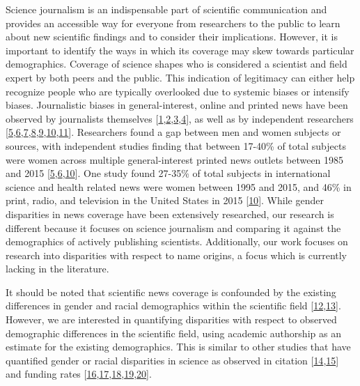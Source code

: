 Science journalism is an indispensable part of scientific communication and provides an accessible way for everyone from researchers to the public to learn about new scientific findings and to consider their implications.
However, it is important to identify the ways in which its coverage may skew towards particular demographics.
Coverage of science shapes who is considered a scientist and field expert by both peers and the public.
This indication of legitimacy can either help recognize people who are typically overlooked due to systemic biases or intensify biases.
Journalistic biases in general-interest, online and printed news have been observed by journalists themselves {[}\protect\hyperlink{ref-9uN0d5DN}{1},\protect\hyperlink{ref-CR5YHhw8}{2},\protect\hyperlink{ref-gud4dlat}{3},\protect\hyperlink{ref-soMuDIhH}{4}{]}, as well as by independent researchers {[}\protect\hyperlink{ref-zAQZlRnL}{5},\protect\hyperlink{ref-2svoFkJj}{6},\protect\hyperlink{ref-1onBkffH}{7},\protect\hyperlink{ref-WRatNaGC}{8},\protect\hyperlink{ref-DvlDdQFN}{9},\protect\hyperlink{ref-1718NkivT}{10},\protect\hyperlink{ref-17aOPYsbT}{11}{]}.
Researchers found a gap between men and women subjects or sources, with independent studies finding that between 17-40\% of total subjects were women across multiple general-interest printed news outlets between 1985 and 2015 {[}\protect\hyperlink{ref-zAQZlRnL}{5},\protect\hyperlink{ref-2svoFkJj}{6},\protect\hyperlink{ref-1718NkivT}{10}{]}.
One study found 27-35\% of total subjects in international science and health related news were women between 1995 and 2015, and 46\% in print, radio, and television in the United States in 2015 {[}\protect\hyperlink{ref-1718NkivT}{10}{]}.
While gender disparities in news coverage have been extensively researched, our research is different because it focuses on science journalism and comparing it against the demographics of actively publishing scientists.
Additionally, our work focuses on research into disparities with respect to name origins, a focus which is currently lacking in the literature.

It should be noted that scientific news coverage is confounded by the existing differences in gender and racial demographics within the scientific field {[}\protect\hyperlink{ref-1A5ym3UHq}{12},\protect\hyperlink{ref-mljKbJAo}{13}{]}.
However, we are interested in quantifying disparities with respect to observed demographic differences in the scientific field, using academic authorship as an estimate for the existing demographics.
This is similar to other studies that have quantified gender or racial disparities in science as observed in citation {[}\protect\hyperlink{ref-45G5HGj2}{14},\protect\hyperlink{ref-tTpbrlgZ}{15}{]} and funding rates {[}\protect\hyperlink{ref-hszzrI56}{16},\protect\hyperlink{ref-lomwLdKL}{17},\protect\hyperlink{ref-hP9R3Quu}{18},\protect\hyperlink{ref-n2VRCgZG}{19},\protect\hyperlink{ref-njNa3CYa}{20}{]}.

